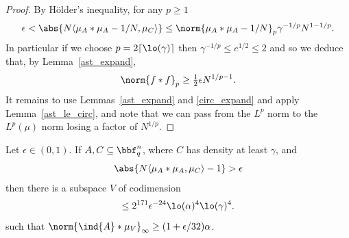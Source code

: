 \begin{proof}
\leanok
By H\"{o}lder's inequality, for any $p\geq 1$
\[\epsilon < \abs{ N\langle \mu_A \ast \mu_A - 1/N, \mu_C \rangle } \leq \norm{\mu_A\ast \mu_A-1/N}_p\gamma^{-1/p}N^{1-1/p}.\]
In particular if we choose $p=2\lceil\lo(\gamma)\rceil$ then $\gamma^{-1/p}\leq e^{1/2}\leq 2$ and so we deduce that, by Lemma~\ref{ast_expand},
\[\norm{f\ast f}_{p}\geq \tfrac{1}{2}\epsilon N^{1/p-1}.\]
It remains to use Lemmas~\ref{ast_expand} and \ref{circ_expand} and apply Lemma~\ref{ast_le_circ}, and note that we can pass from the $L^p$ norm to the $L^p(\mu)$ norm losing a factor of $N^{1/p}$.
\end{proof}


\begin{proposition}
\label{di_in_ff}
\leanok
Let $\epsilon \in (0,1)$. If $A,C\subseteq \bbf_q^n$, where $C$ has density at least $\gamma$, and
\[\abs{N\langle \mu_A\ast \mu_A,\mu_C\rangle -1}> \epsilon\]
then there is a subspace $V$ of codimension
\[\leq 2^{171}\epsilon^{-24}\lo(\alpha)^4\lo(\gamma)^4.\]
such that $\norm{\ind{A}\ast \mu_V}_\infty \geq (1+\epsilon/32)\alpha$.
\end{proposition}

